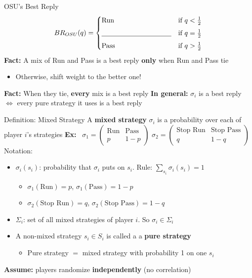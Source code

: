 \begin{frame}{OSU's Best Reply}
$$BR_{OSU}(q)=\begin{cases}
\text{Run} & \text{if } q<\tfrac12 \\[4pt]
\text{\underline{\hspace{1.4in}}} & \text{if } q=\tfrac12 \\[4pt]
\text{Pass} & \text{if } q>\tfrac12
\end{cases}$$
\bsk
\textbf{Fact:} A mix of Run and Pass is a best reply \textbf{only} when Run and Pass tie
\begin{itemize}
    \item Otherwise, shift weight to the better one!
\end{itemize}
\bsk
\textbf{Fact:} When they tie, \textbf{every} mix is a best reply
\vfill
\textbf{In general:} $\sigma_i$ is a best reply $\iff$ every pure strategy it uses is a best reply
\vspace{-0.4in}
\end{frame}

\begin{frame}{Definition: Mixed Strategy}
A \textbf{mixed strategy} $\sigma_i$ is a probability over each of player $i$'s strategies
\bsk
\textbf{Ex:} \ $\sigma_1=\begin{pmatrix} \text{Run} & \text{Pass} \\ p & 1-p\end{pmatrix}$
\qquad
$\sigma_2=\begin{pmatrix} \text{Stop Run} & \text{Stop Pass} \\ q & 1-q\end{pmatrix}$
\bsk
Notation:
\begin{itemize}
    \item $\sigma_i(s_i)$: probability that $\sigma_i$ puts on $s_i$. Rule: $\sum_{s_i} \sigma_i(s_i)=1$
    \begin{itemize}
        \item $\sigma_1(\text{Run})=p$, $\sigma_1(\text{Pass})=1-p$
        \item $\sigma_2(\text{Stop Run})=q$, $\sigma_2(\text{Stop Pass})=1-q$
    \end{itemize}
    \item $\Sigma_i$: set of all mixed strategies of player $i$. So $\sigma_i\in \Sigma_i$
    \item A non-mixed strategy $s_i\in S_i$ is called a a \textbf{pure strategy}
    \begin{itemize}
        \item Pure strategy $=$ mixed strategy with probability 1 on one $s_i$
    \end{itemize}
\end{itemize}
\vfill
\textbf{Assume:} players randomize \textbf{independently} (no correlation)
\vspace{-0.3in}
\end{frame}

